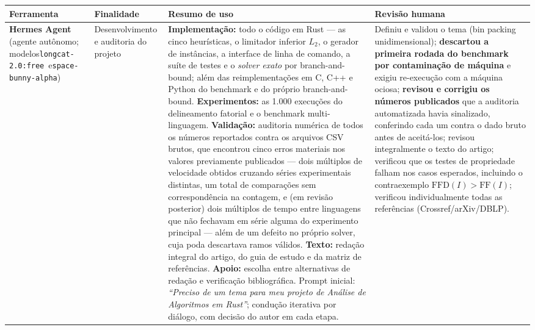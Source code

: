 \documentclass[12pt]{article}
\begin{document}
\begin{table}[htbp]
\centering
\scriptsize
\setlength{\tabcolsep}{2.5pt}
\renewcommand{\arraystretch}{1.15}
\begin{tabularx}{\textwidth}{@{}
  >{\hsize=0.62\hsize\raggedright\arraybackslash}X
  >{\hsize=0.68\hsize\raggedright\arraybackslash}X
  >{\hsize=1.45\hsize\raggedright\arraybackslash}X
  >{\hsize=1.25\hsize\raggedright\arraybackslash}X
  @{}}
\toprule
\textbf{Ferramenta} & \textbf{Finalidade} & \textbf{Resumo de uso} & \textbf{Revisão humana} \\
\midrule

\textbf{Hermes Agent}\newline
(agente autônomo; modelos\newline \texttt{longcat-2.0:\allowbreak free}\ e\newline \texttt{space-bunny-}\newline \texttt{alpha}) &
Desenvolvimento e auditoria do projeto &
\textbf{Implementação:} todo o código em Rust --- as cinco heurísticas, o limitador inferior $L_2$, o gerador de instâncias, a interface de linha de comando, a suíte de testes e o \emph{solver exato} por branch-and-bound; além das reimplementações em C, C++ e Python do benchmark e do próprio branch-and-bound. \textbf{Experimentos:} as 1.000 execuções do delineamento fatorial e o benchmark multi-linguagem. \textbf{Validação:} auditoria numérica de todos os números reportados contra os arquivos CSV brutos, que encontrou cinco erros materiais nos valores previamente publicados — dois múltiplos de velocidade obtidos cruzando séries experimentais distintas, um total de comparações sem correspondência na contagem, e (em revisão posterior) dois múltiplos de tempo entre linguagens que não fechavam em série alguma do experimento principal --- além de um defeito no próprio solver, cuja poda descartava ramos válidos. \textbf{Texto:} redação integral do artigo, do guia de estudo e da matriz de referências. \textbf{Apoio:} escolha entre alternativas de redação e verificação bibliográfica. Prompt inicial: \textit{``Preciso de um tema para meu projeto de Análise de Algoritmos em Rust''}; condução iterativa por diálogo, com decisão do autor em cada etapa. &
Definiu e validou o tema (bin packing unidimensional); \textbf{descartou a primeira rodada do benchmark por contaminação de máquina} e exigiu re-execução com a máquina ociosa; \textbf{revisou e corrigiu os números publicados} que a auditoria automatizada havia sinalizado, conferindo cada um contra o dado bruto antes de aceitá-los; revisou integralmente o texto do artigo; verificou que os testes de propriedade falham nos casos esperados, incluindo o contraexemplo $\mathrm{FFD}(I) > \mathrm{FF}(I)$; verificou individualmente todas as referências (Crossref/arXiv/DBLP). \\


\end{tabularx}
\end{table}
\end{document}
